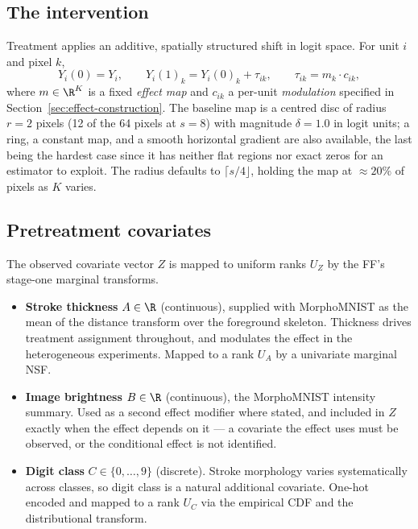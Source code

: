 \subsection{The intervention}

Treatment applies an additive, spatially structured shift in logit space. For unit $i$ and
pixel $k$,
\begin{equation}
    Y_i(0) = Y_i, \qquad Y_i(1)_k = Y_i(0)_k + \tau_{ik},
    \qquad
    \tau_{ik} = m_k \cdot c_{ik},
    \label{eq:potential-outcomes}
\end{equation}
where $m \in \R^K$ is a fixed \emph{effect map} and $c_{ik}$ a per-unit \emph{modulation}
specified in Section~\ref{sec:effect-construction}. The baseline map is a centred disc of
radius $r = 2$ pixels (12 of the 64 pixels at $s = 8$) with magnitude $\delta = 1.0$ in logit
units; a ring, a constant map, and a smooth horizontal gradient are also available, the last
being the hardest case since it has neither flat regions nor exact zeros for an estimator to
exploit. The radius defaults to $\lceil s/4 \rfloor$, holding the map at $\approx 20\%$ of
pixels as $K$ varies.

\subsection{Pretreatment covariates}

The observed covariate vector $Z$ is mapped to uniform ranks $U_Z$ by the FF's stage-one
marginal transforms.

\begin{itemize}
    \item \textbf{Stroke thickness} $A \in \R$ (continuous), supplied with MorphoMNIST as the
    mean of the distance transform over the foreground skeleton. Thickness drives treatment
    assignment throughout, and modulates the effect in the heterogeneous experiments. Mapped
    to a rank $U_A$ by a univariate marginal NSF.

    \item \textbf{Image brightness} $B \in \R$ (continuous), the MorphoMNIST intensity
    summary. Used as a second effect modifier where stated, and included in $Z$ exactly when
    the effect depends on it --- a covariate the effect uses must be observed, or the
    conditional effect is not identified.

    \item \textbf{Digit class} $C \in \{0, \ldots, 9\}$ (discrete). Stroke morphology varies
    systematically across classes, so digit class is a natural additional covariate. One-hot
    encoded and mapped to a rank $U_C$ via the empirical CDF and the distributional transform.
\end{itemize}


